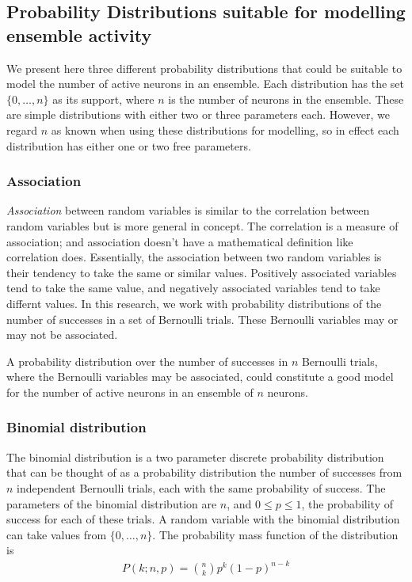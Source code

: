 \documentclass[a4paper,12pt]{article}
\theoremstyle{definition}
\begin{document}
    \subsection{Probability Distributions suitable for modelling ensemble activity}

    We present here three different probability distributions that could be suitable to model the number of active neurons in an ensemble. Each distribution has the set $\lbrace 0, \dots, n \rbrace$ as its support, where $n$ is the number of neurons in the ensemble. These are simple distributions with either two or three parameters each. However, we regard $n$ as known when using these distributions for modelling, so in effect each distribution has either one or two free parameters.

      \subsubsection{Association}
      \textit{Association} between random variables is similar to the correlation between random variables but is more general in concept. The correlation is a measure of association; and association doesn't have a mathematical definition like correlation does. Essentially, the association between two random variables is their tendency to take the same or similar values. Positively associated variables tend to take the same value, and negatively associated variables tend to take differnt values. In this research, we work with probability distributions of the number of successes in a set of Bernoulli trials. These Bernoulli variables may or may not be associated.

      A probability distribution over the number of successes in $n$ Bernoulli trials, where the Bernoulli variables may be associated, could constitute a good model for the number of active neurons in an ensemble of $n$ neurons.

      \subsubsection{Binomial distribution}
      The binomial distribution is a two parameter discrete probability distribution that can be thought of as a probability distribution the number of successes from $n$ independent Bernoulli trials, each with the same probability of success. The parameters of the binomial distribution are $n$, and $0 \leq p \leq 1$, the probability of success for each of these trials. A random variable with the binomial distribution can take values from $\lbrace 0, \dots, n \rbrace$. The probability mass function of the distribution is
      \begin{align}\label{eq:binomial_pmf}
        P(k;n,p) = \binom{n}{k} p^k (1-p)^{n-k}
      \end{align}
\end{document}
